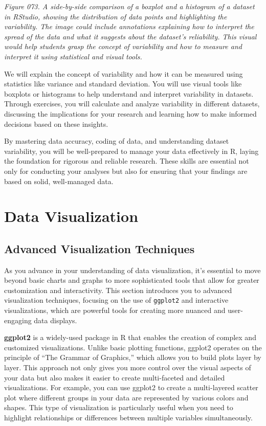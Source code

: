 \documentclass[
]{book}
\begin{document}
\emph{Figure 073. A side-by-side comparison of a boxplot and a histogram of a dataset in RStudio, showing the distribution of data points and highlighting the variability. The image could include annotations explaining how to interpret the spread of the data and what it suggests about the dataset's reliability. This visual would help students grasp the concept of variability and how to measure and interpret it using statistical and visual tools.}

We will explain the concept of variability and how it can be measured using statistics like variance and standard deviation. You will use visual tools like boxplots or histograms to help understand and interpret variability in datasets. Through exercises, you will calculate and analyze variability in different datasets, discussing the implications for your research and learning how to make informed decisions based on these insights.

By mastering data accuracy, coding of data, and understanding dataset variability, you will be well-prepared to manage your data effectively in R, laying the foundation for rigorous and reliable research. These skills are essential not only for conducting your analyses but also for ensuring that your findings are based on solid, well-managed data.

\section{Data Visualization}\label{data-visualization}

\subsection{Advanced Visualization Techniques}\label{advanced-visualization-techniques}

As you advance in your understanding of data visualization, it's essential to move beyond basic charts and graphs to more sophisticated tools that allow for greater customization and interactivity. This section introduces you to advanced visualization techniques, focusing on the use of \texttt{ggplot2} and interactive visualizations, which are powerful tools for creating more nuanced and user-engaging data displays.

\textbf{ggplot2} is a widely-used package in R that enables the creation of complex and customized visualizations. Unlike basic plotting functions, ggplot2 operates on the principle of ``The Grammar of Graphics,'' which allows you to build plots layer by layer. This approach not only gives you more control over the visual aspects of your data but also makes it easier to create multi-faceted and detailed visualizations. For example, you can use ggplot2 to create a multi-layered scatter plot where different groups in your data are represented by various colors and shapes. This type of visualization is particularly useful when you need to highlight relationships or differences between multiple variables simultaneously.
\end{document}
